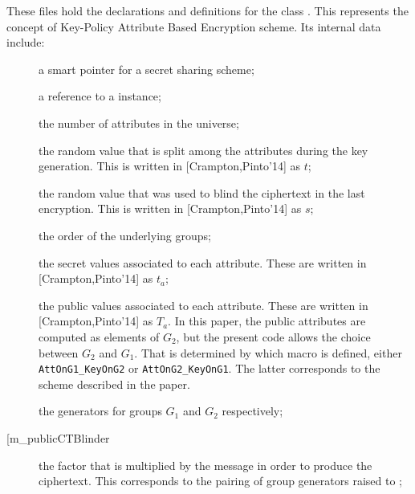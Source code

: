 \documentclass{article}
\begin{document}
These files hold the declarations and definitions for the class \cKPABE. This represents the concept of Key-Policy Attribute Based Encryption scheme. Its internal data include:
\begin{description}
\item[] a smart pointer for a secret sharing scheme;
\item[] a reference to a \cPFC instance;
\item[] the number of attributes in the universe;
\item[] the random value that is split among the attributes during the key generation. This is written in [Crampton,Pinto'14] as $t$;
\item[] the random value that was used to blind the ciphertext in the last encryption. This is written in [Crampton,Pinto'14] as $s$;
\item[] the order of the underlying groups;
\item[] the secret values associated to each attribute. These are written in [Crampton,Pinto'14] as $t_a$;
\item[] the public values associated to each attribute. These are written in [Crampton,Pinto'14] as $T_a$. In this paper, the public attributes are computed as elements of $G_2$, but the present code allows the choice between $G_2$ and $G_1$. That is determined by which macro is defined, either \verb|AttOnG1_KeyOnG2| or \verb|AttOnG2_KeyOnG1|. The latter corresponds to the scheme described in the paper.
\item[] the generators for groups $G_1$ and $G_2$ respectively;
\item[\code[m\_publicCTBlinder] the factor that is multiplied by the message in order to produce the ciphertext. This corresponds to the pairing of group generators raised to ;
\end{description}
\end{document}
